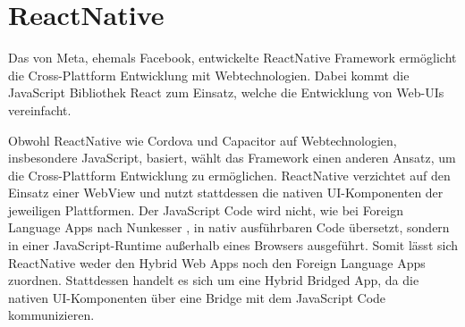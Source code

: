 \section{ReactNative}
\label{sec:Frameorks_ReactNative}

Das von Meta, ehemals Facebook, entwickelte ReactNative Framework ermöglicht die Cross-Plattform Entwicklung mit Webtechnologien.
Dabei kommt die JavaScript Bibliothek React zum Einsatz, welche die Entwicklung von Web-\acp{UI} vereinfacht.

Obwohl ReactNative wie Cordova und Capacitor auf Webtechnologien, insbesondere JavaScript, basiert, wählt das Framework einen anderen Ansatz, um die Cross-Plattform Entwicklung zu ermöglichen.
ReactNative verzichtet auf den Einsatz einer WebView und nutzt stattdessen die nativen \ac{UI}-Komponenten der jeweiligen Plattformen.
Der JavaScript Code wird nicht, wie bei Foreign Language Apps nach Nunkesser \cite{Nunkesser_Taxonomy_Apps}, in nativ ausführbaren Code übersetzt, sondern in einer JavaScript-Runtime außerhalb eines Browsers ausgeführt.
Somit lässt sich ReactNative weder den Hybrid Web Apps noch den Foreign Language Apps zuordnen.
Stattdessen handelt es sich um eine Hybrid Bridged App, da die nativen \ac{UI}-Komponenten über eine Bridge mit dem JavaScript Code kommunizieren.